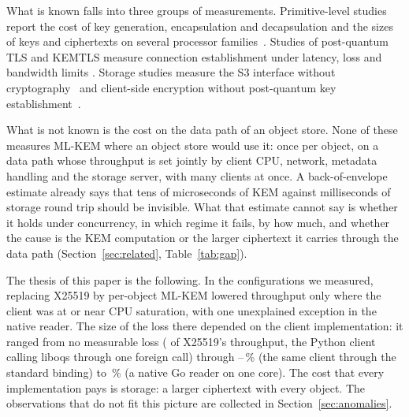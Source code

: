 \documentclass[review,12pt]{elsarticle}
\begin{document}
What is known falls into three groups of measurements. Primitive-level studies report the cost of key generation, encapsulation
and decapsulation and the sizes of keys and ciphertexts on several processor
families~\cite{liboqs,rodriguez2025,demir2025,lopez2025}. Studies of post-quantum TLS and KEMTLS
measure connection establishment under latency, loss and bandwidth limits
\cite{paquin2020,sikeridis2020,sosnowski2023,giron2023}. Storage studies measure the S3 interface
without cryptography~\cite{gadban2021} and client-side encryption without post-quantum key
establishment~\cite{henziger2019,ozeri2023}.

What is not known is the cost on the data path of an object store. None of these measures ML-KEM where an object store would use it: once
per object, on a data path whose throughput is set jointly by client CPU, network, metadata
handling and the storage server, with many clients at once. A back-of-envelope estimate already
says that tens of microseconds of KEM against milliseconds of storage round trip should be
invisible. What that estimate cannot say is whether it holds under concurrency, in which regime
it fails, by how much, and whether the cause is the KEM computation or the larger ciphertext it
carries through the data path (Section~\ref{sec:related}, Table~\ref{tab:gap}).

The thesis of this paper is the following. In the configurations we measured, replacing X25519 by per-object ML-KEM lowered
throughput only where the client was at or near CPU saturation, with one unexplained exception
in the native reader. The size of the loss there depended on the client implementation: it
ranged from no measurable
loss (\AudBindReleasedRatio{} of X25519's throughput, the Python client calling liboqs through
one foreign call) through \RevHotDeficit--\ArmHotDeficit\,\% (the same client through the
standard binding) to \AudNOneMlkemDeficit\,\% (a native Go reader on one core). The cost that
every implementation pays is storage: a larger ciphertext with every object. The observations
that do not fit this picture are collected in Section~\ref{sec:anomalies}.
\end{document}

